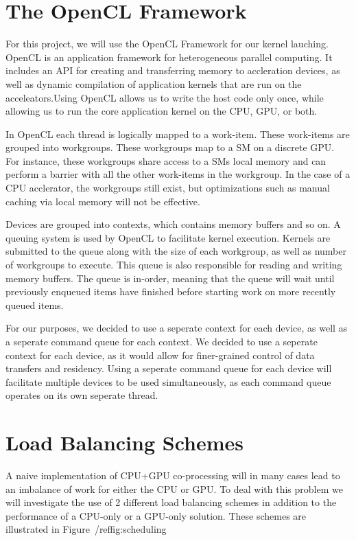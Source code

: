\documentclass[journal]{IEEEtran}
\begin{document}
\section{The OpenCL Framework}
For this project, we will use the OpenCL Framework for our kernel lauching.  OpenCL
is an application framework for heterogeneous parallel computing.  It includes an
API for creating and transferring memory to accleration devices, as well as dynamic
compilation of application kernels that are run on the acceleators.Using OpenCL 
allows us to write the host code only once, while allowing us to run the core 
application kernel on the CPU, GPU, or both.

In OpenCL each thread is logically mapped to a work-item.  These work-items are grouped into
workgroups.  These workgroups map to a SM on a discrete GPU.  For instance, these workgroups
share access to a SMs local memory and can perform a barrier with all the other work-items
in the workgroup.  In the case of a CPU acclerator, the workgroups still exist, but optimizations
such as manual caching via local memory will not be effective.

Devices are grouped into contexts, which contains memory buffers and so on.  A queuing system
is used by OpenCL to facilitate kernel execution.  Kernels are submitted to the queue along with
the size of each workgroup, as well as number of workgroups to execute.  This queue is also 
responsible for reading and writing memory buffers.  The queue is in-order, meaning that 
the queue will wait until previously enqueued items have finished before starting work 
on more recently queued items.

For our purposes, we decided to use a seperate context for each device, as well as a seperate
command queue for each context.  We decided to use a seperate context for each device, as it would
allow for finer-grained control of data transfers and residency. Using a seperate command queue
for each device will facilitate multiple devices to be used simultaneously, as each command queue
operates on its own seperate thread.

\section{Load Balancing Schemes}
A naive implementation of CPU+GPU co-processing will in many cases lead to an imbalance
of work for either the CPU or GPU.  To deal with this problem we will investigate the
use of 2 different load balancing schemes in addition to the performance of a CPU-only or
a GPU-only solution.  These schemes are illustrated in Figure~/ref{fig:scheduling}
\end{document}
